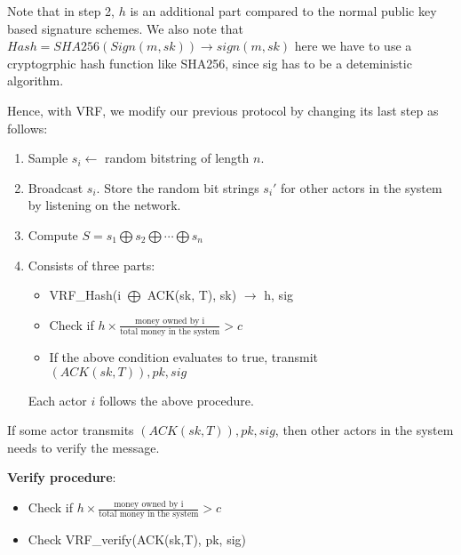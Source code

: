 \documentclass[twoside]{article}
\begin{document}
Note that in step 2, $h$ is an additional part compared to the normal public key based signature schemes.
We also note that $Hash = SHA256(Sign(m,sk)) \rightarrow{} sign(m,sk)$ here we have to use a  cryptogrphic hash function like SHA256, since sig has to be a deteministic algorithm.

Hence, with VRF, we modify our previous protocol by changing its last step as follows:
\begin{enumerate}
	\item Sample $s_{i} \leftarrow{}$ random bitstring of length $n$.
    \item Broadcast $s_{i}$. Store the random bit strings $s_{i}'$ for other actors in the system by listening on the network.
    \item Compute $S = s_{1} \bigoplus s_{2} \bigoplus \cdots \bigoplus s_{n}$
    \item Consists of three parts:
    \begin{itemize}
		\item VRF\_Hash(i $\bigoplus$ ACK(sk, T), sk) $\rightarrow{}$ h, sig
		\item Check if $h \times \frac{\mbox{money owned by i}}{\mbox{total money in the system}} > c$
		\item If the above condition evaluates to true, transmit $(ACK(sk, T)), pk, sig$
	\end{itemize}
	Each actor $i$ follows the above procedure.
\end{enumerate}

If some actor transmits $(ACK(sk, T)), pk, sig$, then other actors in the system needs to verify the message.

\textbf{Verify procedure}:
	\begin{itemize}
		\item Check if $h \times \frac{\mbox{money owned by i}}{\mbox{total money in the system}} > c$
		\item Check VRF\_verify(ACK(sk,T), pk, sig)
	\end{itemize}
\end{document}
